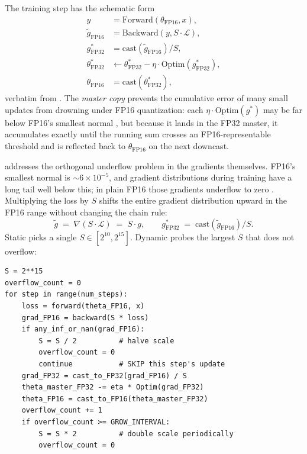 The training step has the schematic form
\begin{equation}
\begin{aligned}
y &= \mathrm{Forward}(\theta_{\text{FP16}}, x), \\
\tilde g_{\text{FP16}} &= \mathrm{Backward}(y, S \cdot \mathcal{L}), \\
g^*_{\text{FP32}} &= \mathrm{cast}(\tilde g_{\text{FP16}}) / S, \\
\theta^*_{\text{FP32}} &\leftarrow \theta^*_{\text{FP32}} - \eta \cdot \mathrm{Optim}(g^*_{\text{FP32}}), \\
\theta_{\text{FP16}} &= \mathrm{cast}(\theta^*_{\text{FP32}}),
\end{aligned}
\label{eq:amp}
\end{equation}
verbatim from \citet[\S 2]{micikevicius2017-mixed-precision}. The
\emph{master copy} prevents the cumulative error of many small updates
from drowning under FP16 quantization: each $\eta \cdot
\mathrm{Optim}(g^*)$ may be far below FP16's smallest normal , but
because it lands in the FP32 master, it accumulates exactly until the
running sum crosses an FP16-representable threshold and is reflected
back to $\theta_{\text{FP16}}$ on the next downcast.

 addresses the orthogonal underflow problem in the
gradients themselves. FP16's smallest normal  is
$\sim\!\!6\times 10^{-5}$, and gradient distributions during 
training have a long tail well below this; in plain FP16 those
gradients underflow to zero
\citep[\S 3]{micikevicius2017-mixed-precision}. Multiplying the loss by
$S$ shifts the entire gradient distribution upward in the FP16 range
without changing the chain rule:
\begin{equation}
\tilde g \;=\; \nabla(S \cdot \mathcal{L}) \;=\; S \cdot g, \qquad
g^*_{\text{FP32}} \;=\; \mathrm{cast}(\tilde g_{\text{FP16}}) / S.
\label{eq:loss-scale}
\end{equation}
Static  picks a single $S \in [2^{10}, 2^{15}]$. Dynamic
 probes the largest $S$ that does not overflow:

\begin{lstlisting}[caption={Dynamic loss scaling (Micikevicius et al.\ 2017, \S 3).}, label=lst:dynamic-ls]
S = 2**15
overflow_count = 0
for step in range(num_steps):
    loss = forward(theta_FP16, x)
    grad_FP16 = backward(S * loss)
    if any_inf_or_nan(grad_FP16):
        S = S / 2          # halve scale
        overflow_count = 0
        continue           # SKIP this step's update
    grad_FP32 = cast_to_FP32(grad_FP16) / S
    theta_master_FP32 -= eta * Optim(grad_FP32)
    theta_FP16 = cast_to_FP16(theta_master_FP32)
    overflow_count += 1
    if overflow_count >= GROW_INTERVAL:
        S = S * 2          # double scale periodically
        overflow_count = 0
\end{lstlisting}

